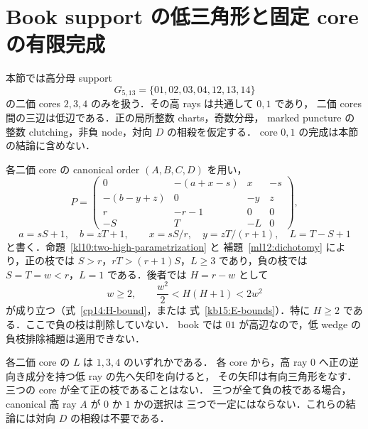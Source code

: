 \section{Book support の低三角形と固定 core の有限完成}
\label{bk19:section}

本節では高分母 support
\[
 G_{5,13}=\{01,02,03,04,12,13,14\}
\]
の二価 cores $2,3,4$ のみを扱う．その高 rays は共通して $0,1$ であり，
二価 cores 間の三辺は低辺である．正の局所整数 charts，奇数分母，
marked puncture の整数 clutching，非負 node，対向 $D$ の相殺を仮定する．
core $0,1$ の完成は本節の結論に含めない．

各二価 core の canonical order $(A,B,C,D)$ を用い，
\begin{equation}\label{bk19:canonical}
 P=\begin{pmatrix}
 0&-(a+x-s)&x&-s\\
 -(b-y+z)&0&-y&z\\
 r&-r-1&0&0\\
 -S&T&-L&0
 \end{pmatrix},
\end{equation}
\[
 a=sS+1,\quad b=zT+1,\qquad
 x=sS/r,\quad y=zT/(r+1),\quad L=T-S+1
\]
と書く．命題~\ref{kl10:two-high-parametrization} と
補題~\ref{ml12:dichotomy} により，正の枝では
$S>r$，$rT>(r+1)S$，$L\ge3$ であり，負の枝では
$S=T=w<r$，$L=1$ である．後者では $H=r-w$ として
\begin{equation}\label{bk19:H-bound}
 w\ge2,\qquad \frac{w^2}{2}<H(H+1)<2w^2
\end{equation}
が成り立つ（式~\eqref{cp14:H-bound}，または
式~\eqref{kb15:E-bounds}）．特に $H\ge2$ である．ここで負の枝は削除していない．
book では $01$ が高辺なので，低 wedge の負枝排除補題は適用できない．

\begin{lemma}\label{bk19:triangle}
各二価 core の $L$ は $1,3,4$ のいずれかである．
各 core から，高 ray $0$ へ正の逆向き成分を持つ低 ray の先へ矢印を向けると，
その矢印は有向三角形をなす．三つの core が全て正の枝であることはない．
三つが全て負の枝である場合，canonical 高 ray $A$ が $0$ か $1$ かの選択は
三つで一定にはならない．これらの結論には対向 $D$ の相殺は不要である．
\end{lemma}

